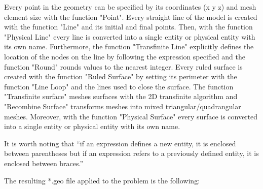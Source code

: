 \documentclass[a4]{article}
\begin{document}
Every point in the geometry can be specified by its coordinates (x y z) and mesh element size with the function "Point". Every straight line of the model is created with the function "Line" and its initial and final points. Then, with the function "Physical Line" every line is converted into a single entity or physical entity with its own name. Furthermore, the function "Transfinite Line" explicitly defines the location of the nodes on the line by following the expression specified and the function "Round" rounds values to the nearest integer. Every ruled surface is created with the function "Ruled Surface" by setting its perimeter with the function "Line Loop" and the lines used to close the surface. The function "Transfinite surface" meshes surfaces with the 2D transfinite algorithm and "Recombine Surface" transforms meshes into mixed triangular/quadrangular meshes. Moreover, with the function "Physical Surface" every surface is converted into a single entity or physical entity with its own name.  

It is worth noting that “if an expression defines a new entity, it is enclosed between parentheses but if an expression refers to a previously defined entity, it is enclosed between braces.” \cite{gmshweb}

The resulting *.geo file applied to the problem is the following:
\end{document}
